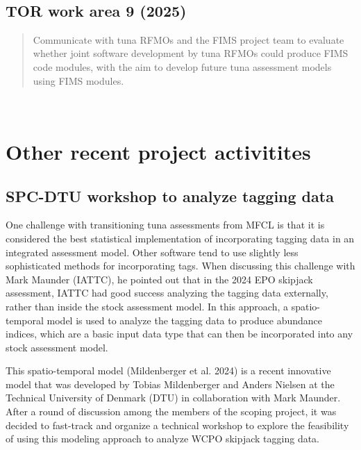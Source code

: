 \documentclass{SCreport}
\begin{document}
\vspace{2ex}

~

\vspace{2ex}

\subsection{TOR work area 9 (2025)}

\begin{quote}\sf
  Communicate with tuna RFMOs and the FIMS project team to evaluate whether
  joint software development by tuna RFMOs could produce FIMS code modules, with
  the aim to develop future tuna assessment models using FIMS modules.
\end{quote}

\vspace{2ex}

~

\vspace{2ex}

\newpage

\section{Other recent project activitites}

\subsection{SPC-DTU workshop to analyze tagging data}
\label{sec:dtu-workshop}

One challenge with transitioning tuna assessments from MFCL is that it is
considered the best statistical implementation of incorporating tagging data in
an integrated assessment model. Other software tend to use slightly less
sophisticated methods for incorporating tags. When discussing this challenge
with Mark Maunder (IATTC), he pointed out that in the 2024 EPO skipjack
assessment, IATTC had good success analyzing the tagging data externally, rather
than inside the stock assessment model. In this approach, a spatio-temporal
model is used to analyze the tagging data to produce abundance indices, which
are a basic input data type that can then be incorporated into any stock
assessment model.

This spatio-temporal model (Mildenberger et al. 2024) is a recent innovative
model that was developed by Tobias Mildenberger and Anders Nielsen at the
Technical University of Denmark (DTU) in collaboration with Mark Maunder. After
a round of discussion among the members of the scoping project, it was decided
to fast-track and organize a technical workshop to explore the feasibility of
using this modeling approach to analyze WCPO skipjack tagging data.
\end{document}
